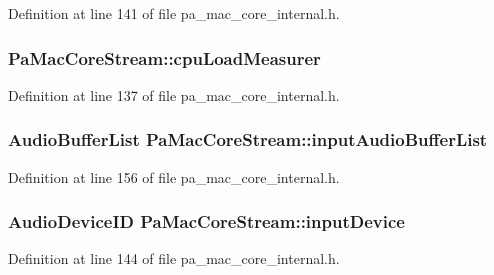 Definition at line 141 of file pa\+\_\+mac\+\_\+core\+\_\+internal.\+h.

\subsubsection[{\texorpdfstring{cpu\+Load\+Measurer}{cpuLoadMeasurer}}]{ Pa\+Mac\+Core\+Stream\+::cpu\+Load\+Measurer}\hypertarget{struct_pa_mac_core_stream_a589be1f91f8332bba6cc1b0b006f9b80}{}\label{struct_pa_mac_core_stream_a589be1f91f8332bba6cc1b0b006f9b80}


Definition at line 137 of file pa\+\_\+mac\+\_\+core\+\_\+internal.\+h.

\subsubsection[{\texorpdfstring{input\+Audio\+Buffer\+List}{inputAudioBufferList}}]{\setlength{\rightskip}{0pt plus 5cm}Audio\+Buffer\+List Pa\+Mac\+Core\+Stream\+::input\+Audio\+Buffer\+List}\hypertarget{struct_pa_mac_core_stream_aa214b3f78a40dd23797a512b0892a098}{}\label{struct_pa_mac_core_stream_aa214b3f78a40dd23797a512b0892a098}


Definition at line 156 of file pa\+\_\+mac\+\_\+core\+\_\+internal.\+h.

\subsubsection[{\texorpdfstring{input\+Device}{inputDevice}}]{\setlength{\rightskip}{0pt plus 5cm}Audio\+Device\+ID Pa\+Mac\+Core\+Stream\+::input\+Device}\hypertarget{struct_pa_mac_core_stream_a84ab00c3940677753cbcfaa0b4497817}{}\label{struct_pa_mac_core_stream_a84ab00c3940677753cbcfaa0b4497817}


Definition at line 144 of file pa\+\_\+mac\+\_\+core\+\_\+internal.\+h.


